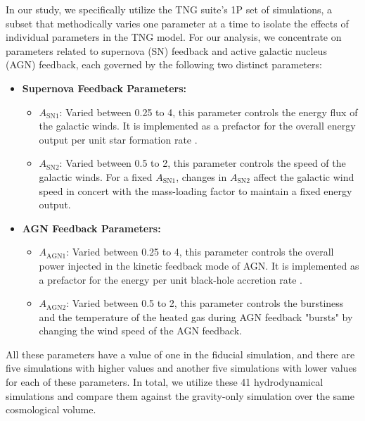 In our study, we specifically utilize the TNG suite's 1P set of simulations, a subset that methodically varies one parameter at a time to isolate the effects of individual parameters in the TNG model. For our analysis, we concentrate on parameters related to supernova (SN) feedback and active galactic nucleus (AGN) feedback, each governed by the following two distinct parameters:
% 
\begin{itemize}
    \item \textbf{Supernova Feedback Parameters:}
    \begin{itemize}
        \item $A_{\mathrm{SN1}}$: Varied between 0.25 to 4, this parameter controls the energy flux of the galactic winds. It is implemented as a prefactor for the overall energy output per unit star formation rate \cite{2018MNRAS.473.4077P,CAMELS_presentation}.
        \item $A_{\mathrm{SN2}}$: Varied between 0.5 to 2, this parameter controls the speed of the galactic winds. For a fixed $A_{\mathrm{SN1}}$, changes in $A_{\mathrm{SN2}}$ affect the galactic wind speed in concert with the mass-loading factor to maintain a fixed energy output.
    \end{itemize}
    \item \textbf{AGN Feedback Parameters:}
    \begin{itemize}
        \item $A_{\mathrm{AGN1}}$: Varied between 0.25 to 4, this parameter controls the overall power injected in the kinetic feedback mode of AGN. It is implemented as a prefactor for the energy per unit black-hole accretion rate \cite{2017MNRAS.465.3291W,CAMELS_presentation}.
        \item $A_{\mathrm{AGN2}}$: Varied between 0.5 to 2, this parameter controls the burstiness and the temperature of the heated gas during AGN feedback "bursts" by changing the wind speed of the AGN feedback.
    \end{itemize}
\end{itemize}
% 
All these parameters have a value of one in the fiducial simulation, and there are five simulations with higher values and another five simulations with lower values for each of these parameters. In total, we utilize these 41 hydrodynamical simulations and compare them against the gravity-only simulation over the same cosmological volume.



